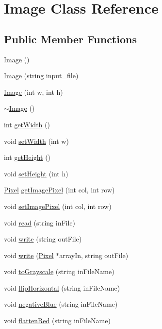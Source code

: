 \hypertarget{classImage}{}\section{Image Class Reference}
\label{classImage}
\subsection*{Public Member Functions}
\begin{DoxyCompactItemize}
\item 
\hyperlink{classImage_a58edd1c45b4faeb5f789b0d036d02313}{Image} ()
\item 
\hyperlink{classImage_af2d2b2b46060ce7d4dda966d1bb29b45}{Image} (string input\+\_\+file)
\item 
\hyperlink{classImage_a05c964ca59502cc32c30e8ab89b5e920}{Image} (int w, int h)
\item 
\hyperlink{classImage_a0294f63700543e11c0f0da85601c7ae5}{$\sim$\+Image} ()
\item 
int \hyperlink{classImage_af2720a072812763395512fc3c8c21362}{get\+Width} ()
\item 
void \hyperlink{classImage_a385abd0ecca8787fe15d9a72ac60001a}{set\+Width} (int w)
\item 
int \hyperlink{classImage_aa4e1f064e5e1f3f04ad605408f1ec3af}{get\+Height} ()
\item 
void \hyperlink{classImage_a6e15783dcc55c301f4e887e27a7c38be}{set\+Height} (int h)
\item 
\hyperlink{structPixel}{Pixel} \hyperlink{classImage_a660ff0ed55722f4cfb9d1d511b379e2c}{get\+Image\+Pixel} (int col, int row)
\item 
void \hyperlink{classImage_a935a28e2ea0fe6f1daef70f3cf4042bc}{set\+Image\+Pixel} (int col, int row)
\item 
void \hyperlink{classImage_a4d32b8fc59d99587542ea6834921958c}{read} (string in\+File)
\item 
void \hyperlink{classImage_a6622902de36f98f373d87d12788fcaf8}{write} (string out\+File)
\item 
void \hyperlink{classImage_ab71d5ac51f8e210d16a93b4fa34c40ed}{write} (\hyperlink{structPixel}{Pixel} $\ast$array\+In, string out\+File)
\item 
void \hyperlink{classImage_a28cae6978dd1876f7a47760511f077ec}{to\+Grayscale} (string in\+File\+Name)
\item 
void \hyperlink{classImage_af02638aea2fda9609af2ef9f3f9dbc3b}{flip\+Horizontal} (string in\+File\+Name)
\item 
void \hyperlink{classImage_a1a5d7d2e612755c22f29a13f4f940da8}{negative\+Blue} (string in\+File\+Name)
\item 
void \hyperlink{classImage_a71d4559ee2624869ab91e1939ee261aa}{flatten\+Red} (string in\+File\+Name)
\end{DoxyCompactItemize}


